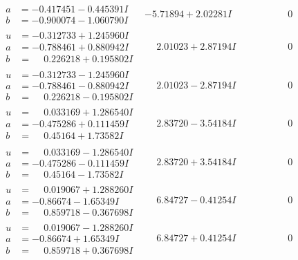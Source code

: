 \documentclass[1p]{elsarticle_modified}
\theoremstyle{definition}
\begin{document}
$$\begin{array}{c|c|c}
\begin{aligned}
a &= -0.417451 - 0.445391 I \\
b &= -0.900074 - 1.060790 I\end{aligned}
 & -5.71894 + 2.02281 I & \phantom{-0.000000 } 0 \\ \hline\begin{aligned}
u &= -0.312733 + 1.245960 I \\
a &= -0.788461 + 0.880942 I \\
b &= \phantom{-}0.226218 + 0.195802 I\end{aligned}
 & \phantom{-}2.01023 + 2.87194 I & \phantom{-0.000000 } 0 \\ \hline\begin{aligned}
u &= -0.312733 - 1.245960 I \\
a &= -0.788461 - 0.880942 I \\
b &= \phantom{-}0.226218 - 0.195802 I\end{aligned}
 & \phantom{-}2.01023 - 2.87194 I & \phantom{-0.000000 } 0 \\ \hline\begin{aligned}
u &= \phantom{-}0.033169 + 1.286540 I \\
a &= -0.475286 + 0.111459 I \\
b &= \phantom{-}0.45164 + 1.73582 I\end{aligned}
 & \phantom{-}2.83720 - 3.54184 I & \phantom{-0.000000 } 0 \\ \hline\begin{aligned}
u &= \phantom{-}0.033169 - 1.286540 I \\
a &= -0.475286 - 0.111459 I \\
b &= \phantom{-}0.45164 - 1.73582 I\end{aligned}
 & \phantom{-}2.83720 + 3.54184 I & \phantom{-0.000000 } 0 \\ \hline\begin{aligned}
u &= \phantom{-}0.019067 + 1.288260 I \\
a &= -0.86674 - 1.65349 I \\
b &= \phantom{-}0.859718 - 0.367698 I\end{aligned}
 & \phantom{-}6.84727 - 0.41254 I & \phantom{-0.000000 } 0 \\ \hline\begin{aligned}
u &= \phantom{-}0.019067 - 1.288260 I \\
a &= -0.86674 + 1.65349 I \\
b &= \phantom{-}0.859718 + 0.367698 I\end{aligned}
 & \phantom{-}6.84727 + 0.41254 I & \phantom{-0.000000 } 0\\

\end{array}$$
\end{document}

